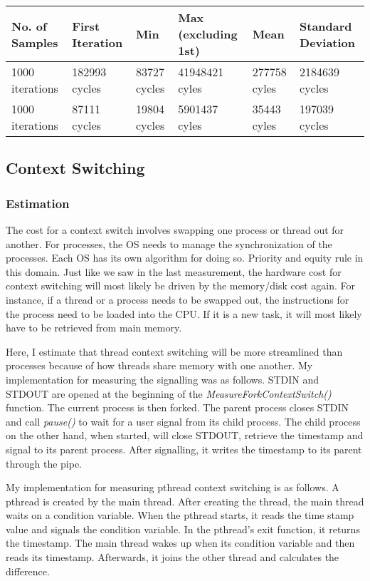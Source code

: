 \documentclass[paper=a4, fontsize=11pt]{scrartcl}
\numberwithin{equation}{section}        %
\numberwithin{figure}{section}          %
\numberwithin{table}{section}               %
\begin{document}
\begin{center}
    \begin{tabular}{ | l | l | l | l | l | l |}
    \hline
    No. of Samples & First Iteration & Min & Max (excluding 1st) & Mean & Standard Deviation \\ \hline
    1000 iterations & 182993 cycles & 83727 cycles & 41948421 cyles & 277758 cyles & 2184639  cycles \\ 
    1000 iterations & 87111 cycles & 19804 cycles & 5901437 cyles & 35443 cyles & 197039 cycles \\ 
    \hline
    \end{tabular}
\end{center}

\subsection{Context Switching}

\subsubsection{Estimation}

The cost for a context switch involves swapping one process or thread out for another.  For processes, the OS needs to manage the synchronization of the processes.  Each OS has its own algorithm for doing so.  Priority and equity rule in this domain.  Just like we saw in the last measurement, the hardware cost for context switching will most likely be driven by the memory/disk cost again.  For instance, if a thread or a process needs to be swapped out, the instructions for the process need to be loaded into the CPU.  If it is a new task, it will most likely have to be retrieved from main memory.

Here, I estimate that thread context switching will be more streamlined than processes because of how threads share memory with one another.  My implementation for measuring the signalling was as follows.  STDIN and STDOUT are opened at the beginning of the  \textit{MeasureForkContextSwitch()} function.  The current process is then forked.  The parent process closes STDIN and call \textit{pause()} to wait for a user signal from its child process.  The child process on the other hand, when started, will close STDOUT, retrieve the timestamp and signal to its parent process.  After signalling, it writes the timestamp to its parent through the pipe.

My implementation for measuring pthread context switching is as follows.  A pthread is created by the main thread.  After creating the thread, the main thread waits on a condition variable.  When the pthread starts, it reads the time stamp value and signals the condition variable.  In the pthread's exit function, it returns the timestamp.  The main thread wakes up when its condition variable and then reads its timestamp.  Afterwards, it joins the other thread and calculates the difference.
\end{document}
